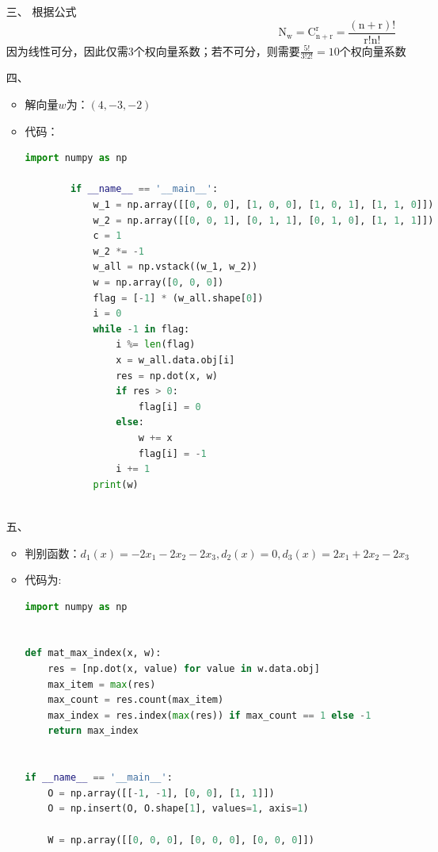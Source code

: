 \documentclass[UTF8,a4paper]{ctexart}
\begin{document}
\begin{itemize}
    \item[三、]
    根据公式$$\mathrm{N}_{\mathrm{w}}=\mathrm{C}_{\mathrm{n}+\mathrm{r}}^{\mathrm{r}}=\frac{(\mathrm{n}+\mathrm{r}) !}{\mathrm{r} ! \mathrm{n} !}$$
    因为线性可分，因此仅需$3$个权向量系数；若不可分，则需要$\frac{5!}{3!2!}=10$个权向量系数
\item[四、] 
\begin{itemize}
    \item 解向量$w$为：$(4,-3,-2)$
    \item 代码：\begin{lstlisting}[language={Python}]
        import numpy as np

        if __name__ == '__main__':
            w_1 = np.array([[0, 0, 0], [1, 0, 0], [1, 0, 1], [1, 1, 0]])
            w_2 = np.array([[0, 0, 1], [0, 1, 1], [0, 1, 0], [1, 1, 1]])
            c = 1
            w_2 *= -1
            w_all = np.vstack((w_1, w_2))
            w = np.array([0, 0, 0])
            flag = [-1] * (w_all.shape[0])
            i = 0
            while -1 in flag:
                i %= len(flag)
                x = w_all.data.obj[i]
                res = np.dot(x, w)
                if res > 0:
                    flag[i] = 0
                else:
                    w += x
                    flag[i] = -1
                i += 1
            print(w)
        
    \end{lstlisting}
\end{itemize}
\item[五、] 
\begin{itemize}
    \item 判别函数：$d_1(x) = -2x_1-2x_2-2x_3,d_2(x)=0,d_3(x)=2x_1+2x_2-2x_3$
    \item 代码为:
    \begin{lstlisting}[language={Python}]
import numpy as np


def mat_max_index(x, w):
    res = [np.dot(x, value) for value in w.data.obj]
    max_item = max(res)
    max_count = res.count(max_item)
    max_index = res.index(max(res)) if max_count == 1 else -1
    return max_index


if __name__ == '__main__':
    O = np.array([[-1, -1], [0, 0], [1, 1]])
    O = np.insert(O, O.shape[1], values=1, axis=1)

    W = np.array([[0, 0, 0], [0, 0, 0], [0, 0, 0]])


\end{lstlisting}
\end{itemize}
\end{itemize}
\end{document}
